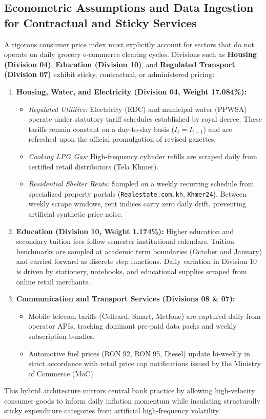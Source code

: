 \subsection{Econometric Assumptions and Data Ingestion for Contractual and Sticky Services}
\hs A rigorous consumer price index must explicitly account for sectors that do not operate on daily grocery e-commerce clearing cycles. Divisions such as \textbf{Housing (Division 04)}, \textbf{Education (Division 10)}, and \textbf{Regulated Transport (Division 07)} exhibit sticky, contractual, or administered pricing:
\begin{enumerate}
    \item \textbf{Housing, Water, and Electricity (Division 04, Weight 17.084\%):}
    \begin{itemize}
        \item \textit{Regulated Utilities:} Electricity (EDC) and municipal water (PPWSA) operate under statutory tariff schedules established by royal decree. These tariffs remain constant on a day-to-day basis ($I_{t} = I_{t-1}$) and are refreshed upon the official promulgation of revised gazettes.
        \item \textit{Cooking LPG Gas:} High-frequency cylinder refills are scraped daily from certified retail distributors (Tela Khmer).
        \item \textit{Residential Shelter Rents:} Sampled on a weekly recurring schedule from specialized property portals (\texttt{Realestate.com.kh}, \texttt{Khmer24}). Between weekly scrape windows, rent indices carry zero daily drift, preventing artificial synthetic price noise.
    \end{itemize}
    \item \textbf{Education (Division 10, Weight 1.174\%):} Higher education and secondary tuition fees follow semester institutional calendars. Tuition benchmarks are sampled at academic term boundaries (October and January) and carried forward as discrete step functions. Daily variation in Division 10 is driven by stationery, notebooks, and educational supplies scraped from online retail merchants.
    \item \textbf{Communication and Transport Services (Divisions 08 \& 07):}
    \begin{itemize}
        \item Mobile telecom tariffs (Cellcard, Smart, Metfone) are captured daily from operator APIs, tracking dominant pre-paid data packs and weekly subscription bundles.
        \item Automotive fuel prices (RON 92, RON 95, Diesel) update bi-weekly in strict accordance with retail price cap notifications issued by the Ministry of Commerce (MoC).
    \end{itemize}
\end{enumerate}
This hybrid architecture mirrors central bank practice by allowing high-velocity consumer goods to inform daily inflation momentum while insulating structurally sticky expenditure categories from artificial high-frequency volatility.

